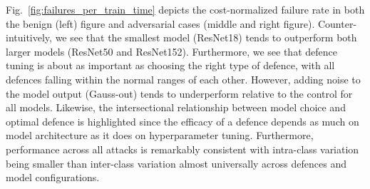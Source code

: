 Fig.~\ref{fig:failures_per_train_time} depicts the cost-normalized failure rate in both the benign (left) figure and adversarial cases (middle and right figure). Counter-intuitively, we see that the smallest model (ResNet18) tends to outperform both larger models (ResNet50 and ResNet152). Furthermore, we see that defence tuning is about as important as choosing the right type of defence, with all defences falling within the normal ranges of each other. However, adding noise to the model output (Gauss-out) tends to underperform relative to the control for all models. Likewise, the intersectional relationship between model choice and optimal defence is highlighted since the efficacy of a defence depends as much on model architecture as it does on hyperparameter tuning.  Furthermore, performance across all attacks is remarkably consistent with intra-class variation being smaller than inter-class variation almost universally across defences and model configurations. 

